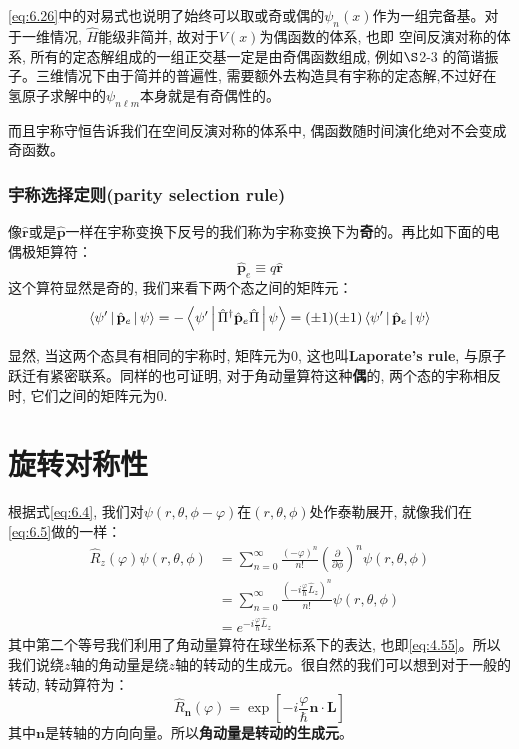 \documentclass[a4paper,zihao=-4,linespread=1]{ctexrep}
\begin{document}
    \ref{eq:6.26}中的对易式也说明了始终可以取或奇或偶的$\psi_n(x)$作为一组完备基。对于一维情况, $\hat{H}$能级非简并, 故对于$V(x)$为偶函数的体系, 也即
    空间反演对称的体系, 所有的定态解组成的一组正交基一定是由奇偶函数组成, 例如$\S$2-3 的简谐振子。三维情况下由于简并的普遍性, 需要额外去构造具有宇称的定态解,不过好在
    氢原子求解中的$\psi_{n\ell m}$本身就是有奇偶性的。

    而且宇称守恒告诉我们在空间反演对称的体系中, 偶函数随时间演化绝对不会变成奇函数。
    
    \subsubsection*{宇称选择定则(parity selection rule)}
    像$\hat{\mathbf{r}}$或是$\hat{\mathbf{p}}$一样在宇称变换下反号的我们称为宇称变换下为\textbf{奇}的。再比如下面的电偶极矩算符：
    \[\hat{\mathbf{p}}_e\equiv q\hat{\mathbf{r}}\]
    这个算符显然是奇的, 我们来看下两个态之间的矩阵元：
    \begin{equation}
        \Braket{\psi^\prime|\hat{\mathbf{p}}_e|\psi}=-\Braket{\psi^\prime|\hat{\Pi}^\dagger\hat{\mathbf{p}}_e\hat{\Pi}|\psi}=(\pm 1)(\pm 1)\Braket{\psi^\prime|\hat{\mathbf{p}}_e|\psi}
    \end{equation}
    
    显然, 当这两个态具有相同的宇称时, 矩阵元为0, 这也叫\textbf{Laporate's rule}, 与原子跃迁有紧密联系。同样的也可证明, 对于角动量算符这种\textbf{偶}的, 
    两个态的宇称相反时, 它们之间的矩阵元为0.

    \section{旋转对称性}
    根据式\ref{eq:6.4}, 我们对$\psi(r,\theta,\phi-\varphi)$在$(r,\theta,\phi)$处作泰勒展开, 就像我们在\ref{eq:6.5}做的一样：
    \begin{align*}
        \hat R_z(\varphi)\psi(r,\theta,\phi)&=\sum_{n=0}^\infty\frac{(-\varphi)^n}{n!}\left(\frac{\partial}{\partial \phi}\right)^n\psi(r,\theta,\phi)\\
        &=\sum_{n=0}^\infty\frac{\left(-i\frac{\varphi}{\hbar}\hat{L}_z\right)^n}{n!}\psi(r,\theta,\phi)\\
        &=\boxed{e^{-i\frac{\varphi}{\hbar}\hat{L}_z}}
    \end{align*}
    其中第二个等号我们利用了角动量算符在球坐标系下的表达, 也即\ref{eq:4.55}。所以我们说绕$z$轴的角动量是绕$z$轴的转动的生成元。很自然的我们可以想到对于一般的转动, 转动算符为：
    \begin{equation}
        \boxed{
            \hat{R}_{\mathbf{n}}(\varphi)=\exp{\left[-i\frac{\varphi}{\hbar}\mathbf{n}\cdot\mathbf{L}\right]}
        }
    \end{equation}
    其中$\mathbf{n}$是转轴的方向向量。所以\textbf{角动量是转动的生成元}。
\end{document}
